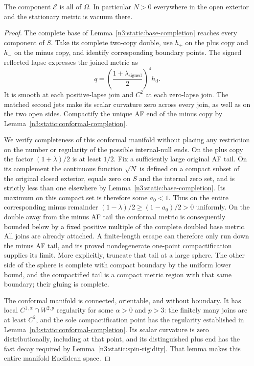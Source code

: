 \begin{lemma}
\label{n3:static:no-internal-null}
The component \(\mathcal E\) is all of \(\Omega\).
In particular \(N>0\) everywhere in the open exterior and the
stationary metric is vacuum there.
\end{lemma}

\begin{proof}
The complete base of Lemma~\ref{n3:static:base-completion} reaches every
component of $S$. Take its complete two-copy double, use $h_+$ on
the plus copy and $h_-$ on the minus copy, and identify corresponding
boundary points. The signed reflected lapse expresses the joined
metric as
\[
q=\left(\frac{1+\lambda_{\mathrm{signed}}}{2}\right)^4h_{\mathrm d}.
\]
It is smooth at each positive-lapse join and $C^2$ at each zero-lapse
join. The matched second jets make its scalar curvature zero across
every join, as well as on the two open sides. Compactify the unique
AF end of the minus copy by
Lemma~\ref{n3:static:conformal-completion}.

We verify completeness of this conformal manifold without placing any
restriction on the number or regularity of the possible internal-null
ends. On the plus copy the factor $(1+\lambda)/2$ is at least $1/2$.
Fix a sufficiently large original AF tail. On its complement the
continuous function $\sqrt N$ is defined on a compact subset of the
original closed exterior, equals zero on $S$ and the internal zero
set, and is strictly less than one elsewhere by
Lemma~\ref{n3:static:base-completion}. Its maximum on this compact set
is therefore some $a_0<1$. Thus on the entire corresponding minus
remainder $(1-\lambda)/2\geq(1-a_0)/2>0$ uniformly. On the double
away from the minus AF tail the conformal metric is consequently
bounded below by a fixed positive multiple of the complete doubled
base metric. All joins are already attached. A finite-length escape
can therefore only run down the minus AF tail, and its proved
nondegenerate one-point compactification supplies its limit. More
explicitly, truncate that tail at a large sphere. The other side of
the sphere is complete with compact boundary by the uniform lower
bound, and the compactified tail is a compact metric region with
that same boundary; their gluing is complete.

The conformal manifold is connected, orientable, and without boundary.
It has local $C^{1,\alpha}\cap W^{2,p}$ regularity for some
$\alpha>0$ and $p>3$: the finitely many joins are at least $C^2$,
and the sole compactification point has the regularity established
in Lemma~\ref{n3:static:conformal-completion}. Its scalar curvature is
zero distributionally, including at that point, and its distinguished
plus end has the fast decay required by
Lemma~\ref{n3:static:spin-rigidity}. That lemma makes this entire
manifold Euclidean space.


\end{proof}
